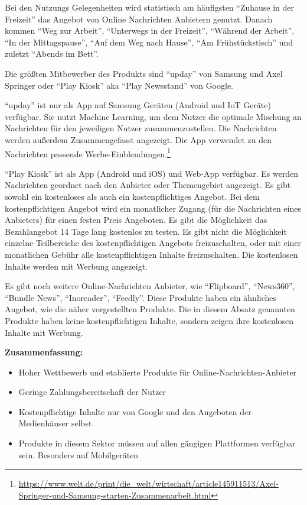 Bei den Nutzungs Gelegenheiten wird statistisch am häufigsten \enquote{Zuhause in der Freizeit} das Angebot von Online Nachrichten Anbietern genutzt. Danach kommen \enquote{Weg zur Arbeit}, \enquote{Unterwegs in der Freizeit}, \enquote{Während der Arbeit}, \enquote{In der Mittagspause}, \enquote{Auf dem Weg nach Hause}, \enquote{Am Frühstückstisch} und zuletzt \enquote{Abends im Bett}.

Die größten Mitbewerber des Produkts sind \enquote{upday} von Samsung und Axel Springer oder \enquote{Play Kiosk} aka \enquote{Play Newsstand} von Google.

\enquote{upday} ist nur als App auf Samsung Geräten (Android und IoT Geräte) verfügbar. Sie nutzt Machine Learning, um dem Nutzer die optimale Mischung an Nachrichten für den jeweiligen Nutzer zusammenzustellen. Die Nachrichten werden außerdem Zusammengefasst angezeigt. Die App verwendet zu den Nachrichten passende Werbe-Einblendungen.\footnote{\url{https://www.welt.de/print/die_welt/wirtschaft/article145911513/Axel-Springer-und-Samsung-starten-Zusammenarbeit.html}}

\enquote{Play Kiosk} ist als App (Android und iOS) und Web-App verfügbar. Es werden Nachrichten geordnet nach den Anbieter oder Themengebiet angezeigt. Es gibt sowohl ein kostenloses als auch ein kostenpflichtiges Angebot. Bei dem kostenpflichtigen Angebot wird ein monatlicher Zugang (für die Nachrichten eines Anbieters) für einen festen Preis Angeboten. Es gibt die Möglichkeit das Bezahlangebot 14 Tage lang kostenlos zu testen. Es gibt nicht die Möglichkeit einzelne Teilbereiche des kostenpflichtigen Angebots freizuschalten, oder mit einer monatlichen Gebühr alle kostenpflichtigen Inhalte freizuschalten. Die kostenlosen Inhalte werden mit Werbung angezeigt.

Es gibt noch weitere Online-Nachrichten Anbieter, wie \enquote{Flipboard}, \enquote{News360}, \enquote{Bundle News}, \enquote{Inoreader}, \enquote{Feedly}. Diese Produkte haben ein ähnliches Angebot, wie die näher vorgestellten Produkte. Die in diesem Absatz genannten Produkte haben keine kostenpflichtigen Inhalte, sondern zeigen ihre kostenlosen Inhalte mit Werbung.

\textbf{Zusammenfassung:}

\begin{itemize}
  \item Hoher Wettbewerb und etablierte Produkte für Online-Nachrichten-Anbieter
  \item Geringe Zahlungsbereitschaft der Nutzer
  \item Kostenpflichtige Inhalte nur von Google und den Angeboten der Medienhäuser selbst
  \item Produkte in diesem Sektor müssen auf allen gängigen Plattformen verfügbar sein. Besonders auf Mobilgeräten
\end{itemize}

